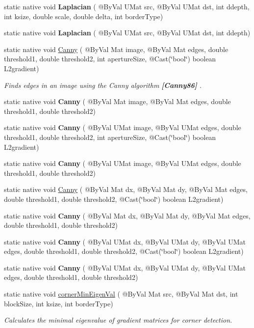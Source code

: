 \begin{DoxyCompactItemize}
static native void {\bfseries Laplacian} ( @By\+Val U\+Mat src, @By\+Val U\+Mat dst, int ddepth, int ksize, double scale, double delta, int border\+Type)
\item 
static native void {\bfseries Laplacian} ( @By\+Val U\+Mat src, @By\+Val U\+Mat dst, int ddepth)
\item 
static native void \hyperlink{group__imgproc__feature_gae85c4c5d2fd8006e4194e3ee73d2277d}{Canny} ( @By\+Val Mat image, @By\+Val Mat edges, double threshold1, double threshold2, int aperture\+Size, @Cast(\char`\"{}bool\char`\"{}) boolean L2gradient)
\begin{DoxyCompactList}\small\item\em Finds edges in an image using the Canny algorithm {\bfseries [Canny86]} . \end{DoxyCompactList}\item 
static native void {\bfseries Canny} ( @By\+Val Mat image, @By\+Val Mat edges, double threshold1, double threshold2)
\item 
static native void {\bfseries Canny} ( @By\+Val U\+Mat image, @By\+Val U\+Mat edges, double threshold1, double threshold2, int aperture\+Size, @Cast(\char`\"{}bool\char`\"{}) boolean L2gradient)
\item 
static native void {\bfseries Canny} ( @By\+Val U\+Mat image, @By\+Val U\+Mat edges, double threshold1, double threshold2)
\item 
static native void \hyperlink{group__imgproc__feature_ga64af31e287f8de7a4fd3ee87c522add9}{Canny} ( @By\+Val Mat dx, @By\+Val Mat dy, @By\+Val Mat edges, double threshold1, double threshold2, @Cast(\char`\"{}bool\char`\"{}) boolean L2gradient)
\item 
static native void {\bfseries Canny} ( @By\+Val Mat dx, @By\+Val Mat dy, @By\+Val Mat edges, double threshold1, double threshold2)
\item 
static native void {\bfseries Canny} ( @By\+Val U\+Mat dx, @By\+Val U\+Mat dy, @By\+Val U\+Mat edges, double threshold1, double threshold2, @Cast(\char`\"{}bool\char`\"{}) boolean L2gradient)
\item 
static native void {\bfseries Canny} ( @By\+Val U\+Mat dx, @By\+Val U\+Mat dy, @By\+Val U\+Mat edges, double threshold1, double threshold2)
\item 
static native void \hyperlink{group__imgproc__feature_gac03777715e9e2aa616d310aa504b86c1}{corner\+Min\+Eigen\+Val} ( @By\+Val Mat src, @By\+Val Mat dst, int block\+Size, int ksize, int border\+Type)
\begin{DoxyCompactList}\small\item\em Calculates the minimal eigenvalue of gradient matrices for corner detection. \end{DoxyCompactList}\item 

\end{DoxyCompactItemize}

